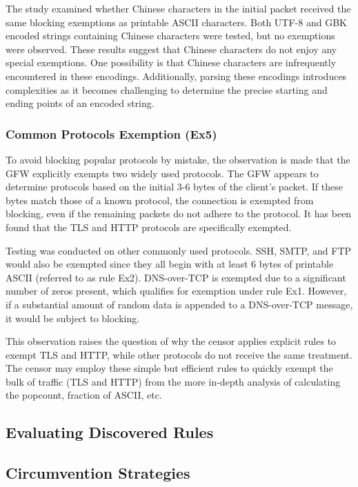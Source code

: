 The study examined whether Chinese characters in the initial packet received the same blocking exemptions as printable ASCII characters. Both UTF-8 and GBK encoded strings containing Chinese characters were tested, but no exemptions were observed. These results suggest that Chinese characters do not enjoy any special exemptions. One possibility is that Chinese characters are infrequently encountered in these encodings. Additionally, parsing these encodings introduces complexities as it becomes challenging to determine the precise starting and ending points of an encoded string.

\subsubsection{Common Protocols Exemption (Ex5)}
To avoid blocking popular protocols by mistake, the observation is made that the GFW explicitly exempts two widely used protocols. The GFW appears to determine protocols based on the initial 3-6 bytes of the client's packet. If these bytes match those of a known protocol, the connection is exempted from blocking, even if the remaining packets do not adhere to the protocol. It has been found that the TLS and HTTP protocols are specifically exempted.

Testing was conducted on other commonly used protocols. SSH, SMTP, and FTP would also be exempted since they all begin with at least 6 bytes of printable ASCII (referred to as rule Ex2). DNS-over-TCP is exempted due to a significant number of zeros present, which qualifies for exemption under rule Ex1. However, if a substantial amount of random data is appended to a DNS-over-TCP message, it would be subject to blocking.

This observation raises the question of why the censor applies explicit rules to exempt TLS and HTTP, while other protocols do not receive the same treatment. The censor may employ these simple but efficient rules to quickly exempt the bulk of traffic (TLS and HTTP) from the more in-depth analysis of calculating the popcount, fraction of ASCII, etc.

\subsection{Evaluating Discovered Rules}

\subsection{Circumvention Strategies}

